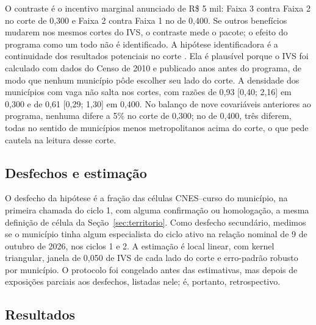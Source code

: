 \documentclass[11pt,a4paper]{article}
\begin{document}
O contraste é o incentivo marginal anunciado de R\$ 5 mil: Faixa 3 contra
Faixa 2 no corte de 0,300 e Faixa 2 contra Faixa 1 no de 0,400. Se outros
benefícios mudarem nos mesmos cortes do IVS, o contraste mede o pacote; o
efeito do programa como um todo não é identificado. A hipótese identificadora é
a continuidade dos resultados potenciais no corte \citep{leelemieux2010}. Ela é
plausível porque o IVS foi calculado com dados do Censo de 2010 e publicado
anos antes do programa, de modo que nenhum município pôde escolher seu lado do
corte. A densidade dos municípios com vaga não salta nos cortes, com razões de
0,93 [0,40; 2,16] em 0,300 e de 0,61 [0,29; 1,30] em 0,400. No balanço de nove
covariáveis anteriores ao programa, nenhuma difere a 5\% no corte de 0,300; no
de 0,400, três diferem, todas no sentido de municípios menos metropolitanos
acima do corte, o que pede cautela na leitura desse corte.

\subsection{Desfechos e estimação}

O desfecho da hipótese é a fração das células CNES--curso do município, na
primeira chamada do ciclo 1, com alguma confirmação ou homologação, a mesma
definição de célula da Seção~\ref{sec:territorio}. Como desfecho secundário,
medimos se o município tinha algum especialista do ciclo ativo na relação
nominal de 9 de outubro de 2026, nos ciclos 1 e 2. A estimação é local linear,
com kernel triangular, janela de 0,050 de IVS de cada lado do corte e
erro-padrão robusto por município. O protocolo foi congelado antes das
estimativas, mas depois de exposições parciais aos desfechos, listadas nele; é,
portanto, retrospectivo.

\subsection{Resultados}
\end{document}
